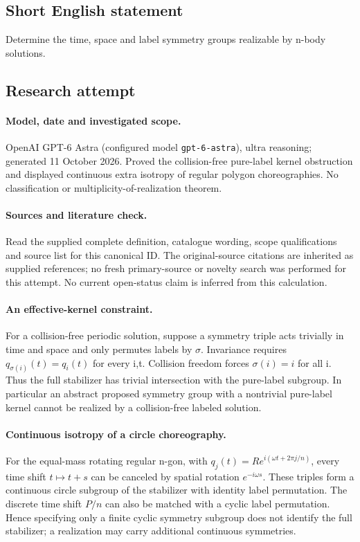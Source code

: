 \documentclass[11pt]{article}
\begin{document}
\subsection{Short English statement}
Determine the time, space and label symmetry groups realizable by n-body solutions.
\subsection{Research attempt}
\paragraph{Model, date and investigated scope.}
OpenAI GPT-6 Astra (configured model \texttt{gpt-6-astra}), ultra reasoning; generated 11 October 2026. Proved the collision-free pure-label kernel obstruction and displayed continuous extra isotropy of regular polygon choreographies. No classification or multiplicity-of-realization theorem.

\paragraph{Sources and literature check.}
Read the supplied complete definition, catalogue wording, scope qualifications and source list for this canonical ID. The original-source citations are inherited as supplied references; no fresh primary-source or novelty search was performed for this attempt. No current open-status claim is inferred from this calculation.

\paragraph{An effective-kernel constraint.}For a collision-free periodic solution, suppose a symmetry triple acts trivially in time and space and only permutes labels by \(\sigma\). Invariance requires \(q_{\sigma(i)}(t)=q_i(t)\) for every i,t. Collision freedom forces \(\sigma(i)=i\) for all i. Thus the full stabilizer has trivial intersection with the pure-label subgroup. In particular an abstract proposed symmetry group with a nontrivial pure-label kernel cannot be realized by a collision-free labeled solution.
\paragraph{Continuous isotropy of a circle choreography.}For the equal-mass rotating regular n-gon, with \(q_j(t)=R e^{i(\omega t+2\pi j/n)}\), every time shift \(t\mapsto t+s\) can be canceled by spatial rotation \(e^{-i\omega s}\). These triples form a continuous circle subgroup of the stabilizer with identity label permutation. The discrete time shift \(P/n\) can also be matched with a cyclic label permutation. Hence specifying only a finite cyclic symmetry subgroup does not identify the full stabilizer; a realization may carry additional continuous symmetries.
\end{document}
